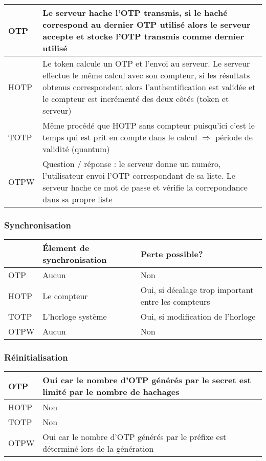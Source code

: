 	\begin{tabular}{| p{3cm} | p{12cm} |}
		\hline
		OTP & Le serveur hache l'OTP transmis, si le haché correspond au
		dernier OTP utilisé alors le serveur accepte et stocke l'OTP transmis
		comme dernier utilisé \\
		\hline
		HOTP & Le token calcule un OTP et l'envoi au serveur. Le serveur
		effectue le même calcul avec son compteur, si les résultats obtenus
		correspondent alors l'authentification est validée et le compteur est
		incrémenté des deux côtés (token et serveur) \\
		\hline
		TOTP & Même procédé que HOTP sans compteur puisqu'ici c'est le temps
		qui est prit en compte dans le calcul $\Rightarrow$ période de
		validité (quantum) \\
		\hline
		OTPW & Question / réponse : le serveur donne un numéro, l'utilisateur
		envoi l'OTP correspondant de sa liste. Le serveur hache ce mot de
		passe et vérifie la correpondance dans sa propre liste\\
		\hline
	\end{tabular}

\subsubsection{Synchronisation}

	\begin{tabular}{| p{3cm} | p{5cm} | p{7cm} |}
		\hline
		& \cellcolor{gray} Élement de synchronisation & \cellcolor{gray} Perte
		possible? \\
		\hline
		OTP & Aucun & Non \\
		\hline
		HOTP & Le compteur & Oui, si décalage trop important entre les
		compteurs \\
		\hline
		TOTP & L'horloge système & Oui, si modification de l'horloge \\
		\hline
		OTPW & Aucun & Non \\
		\hline
	\end{tabular}

\subsubsection{Réinitialisation}

	\begin{tabular}{| p{3cm} | p{12cm} |}
		\hline
		OTP & Oui car le nombre d'OTP générés par le secret est limité par le
		nombre de hachages \\
		\hline
		HOTP & Non \\
		\hline
		TOTP & Non \\
		\hline
		OTPW & Oui car le nombre d'OTP générés par le préfixe est déterminé
		lors de la génération \\
		\hline
	\end{tabular}

